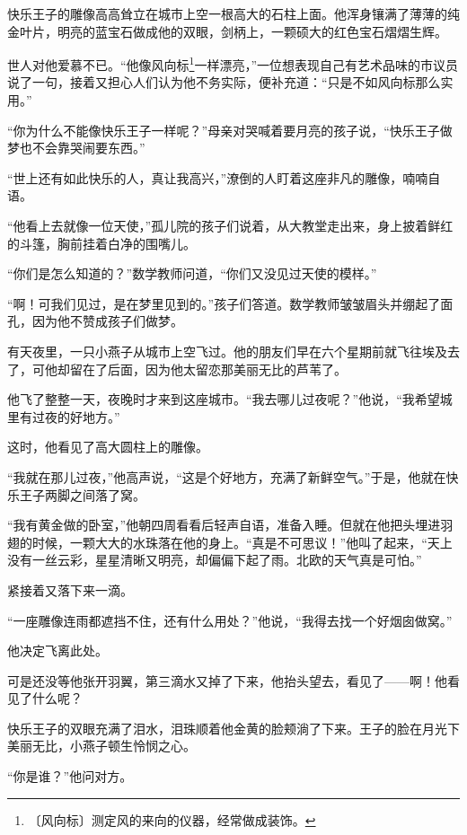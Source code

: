 \documentclass[12pt,UTF-8,openany]{ctexbook}
\begin{document}
\begin{large}
    
    快乐王子的雕像高高耸立在城市上空一根高大的石柱上面。他浑身镶满了薄薄的纯金叶片，明亮的蓝宝石做成他的双眼，剑柄上，一颗硕大的红色宝石熠熠生辉。
    
    世人对他爱慕不已。“他像风向标\footnote{〔风向标〕测定风的来向的仪器，经常做成装饰。}一样漂亮，”一位想表现自己有艺术品味的市议员说了一句，接着又担心人们认为他不务实际，便补充道：“只是不如风向标那么实用。”
    
    “你为什么不能像快乐王子一样呢？”母亲对哭喊着要月亮的孩子说，“快乐王子做梦也不会靠哭闹要东西。”
    
    “世上还有如此快乐的人，真让我高兴，”潦倒的人盯着这座非凡的雕像，喃喃自语。
    
    “他看上去就像一位天使，”孤儿院的孩子们说着，从大教堂走出来，身上披着鲜红的斗篷，胸前挂着白净的围嘴儿。
    
    “你们是怎么知道的？”数学教师问道，“你们又没见过天使的模样。”
    
    “啊！可我们见过，是在梦里见到的。”孩子们答道。数学教师皱皱眉头并绷起了面孔，因为他不赞成孩子们做梦。
    
    有天夜里，一只小燕子从城市上空飞过。他的朋友们早在六个星期前就飞往埃及去了，可他却留在了后面，因为他太留恋那美丽无比的芦苇了。
    
    他飞了整整一天，夜晚时才来到这座城市。“我去哪儿过夜呢？”他说，“我希望城里有过夜的好地方。”
    
    这时，他看见了高大圆柱上的雕像。
    
    “我就在那儿过夜，”他高声说，“这是个好地方，充满了新鲜空气。”于是，他就在快乐王子两脚之间落了窝。
    
    “我有黄金做的卧室，”他朝四周看看后轻声自语，准备入睡。但就在他把头埋进羽翅的时候，一颗大大的水珠落在他的身上。“真是不可思议！”他叫了起来，“天上没有一丝云彩，星星清晰又明亮，却偏偏下起了雨。北欧的天气真是可怕。”
    
    紧接着又落下来一滴。
    
    “一座雕像连雨都遮挡不住，还有什么用处？”他说，“我得去找一个好烟囱做窝。”
    
    他决定飞离此处。
    
    可是还没等他张开羽翼，第三滴水又掉了下来，他抬头望去，看见了——啊！他看见了什么呢？
    
    快乐王子的双眼充满了泪水，泪珠顺着他金黄的脸颊淌了下来。王子的脸在月光下美丽无比，小燕子顿生怜悯之心。
    
    “你是谁？”他问对方。
    

\end{large}
\end{document}
